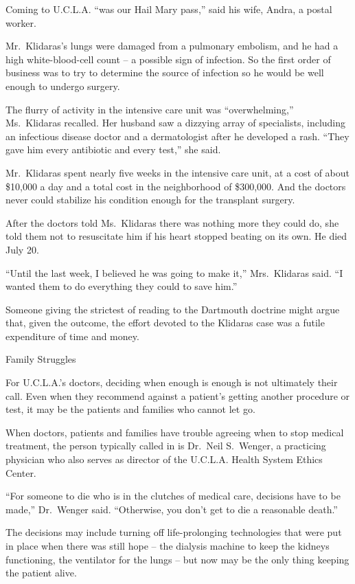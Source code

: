 ﻿\documentclass[12pt]{article}
\begin{document}
Coming to U.C.L.A. ``was our Hail Mary pass,'' said his wife, Andra, a postal worker.

Mr.~Klidaras's lungs were damaged from a pulmonary embolism, and he had a high white-blood-cell
count -- a possible sign of infection. So the first order of business was to try to determine the
source of infection so he would be well enough to undergo surgery.

The flurry of activity in the intensive care unit was ``overwhelming,'' Ms.~Klidaras recalled. Her
husband saw a dizzying array of specialists, including an infectious disease doctor and a
dermatologist after he developed a rash. ``They gave him every antibiotic and every test,'' she
said.

Mr.~Klidaras spent nearly five weeks in the intensive care unit, at a cost of about \$10,000 a day
and a total cost in the neighborhood of \$300,000. And the doctors never could stabilize his
condition enough for the transplant surgery.

After the doctors told Ms.~Klidaras there was nothing more they could do, she told them not to
resuscitate him if his heart stopped beating on its own. He died July 20.

``Until the last week, I believed he was going to make it,'' Mrs.~Klidaras said. ``I wanted them to
do everything they could to save him.''

Someone giving the strictest of reading to the Dartmouth doctrine might argue that, given the
outcome, the effort devoted to the Klidaras case was a futile expenditure of time and money.

Family Struggles

For U.C.L.A.'s doctors, deciding when enough is enough is not ultimately their call. Even when they
recommend against a patient's getting another procedure or test, it may be the patients and families
who cannot let go.

When doctors, patients and families have trouble agreeing when to stop medical treatment, the person
typically called in is Dr.~Neil S.~Wenger, a practicing physician who also serves as director of the
U.C.L.A. Health System Ethics Center.

``For someone to die who is in the clutches of medical care, decisions have to be made,'' Dr.~Wenger
said. ``Otherwise, you don't get to die a reasonable death.''

The decisions may include turning off life-prolonging technologies that were put in place when there
was still hope -- the dialysis machine to keep the kidneys functioning, the ventilator for the lungs
-- but now may be the only thing keeping the patient alive.
\end{document}
